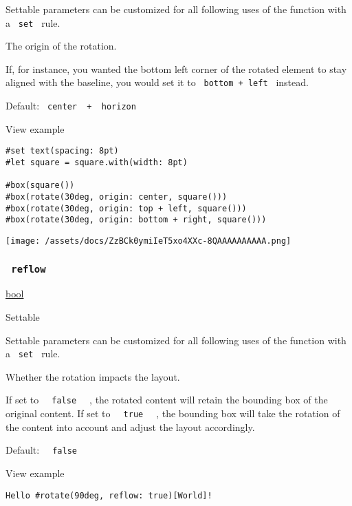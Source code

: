 \label{parameters-origin-settable-tooltip}
Settable parameters can be customized for all following uses of the
function with a \texttt{\ set\ } rule.

The origin of the rotation.

If, for instance, you wanted the bottom left corner of the rotated
element to stay aligned with the baseline, you would set it to
\texttt{\ bottom\ +\ left\ } instead.

Default: \texttt{\ center\ }{\texttt{\ +\ }}\texttt{\ horizon\ }


View example

\begin{verbatim}
#set text(spacing: 8pt)
#let square = square.with(width: 8pt)

#box(square())
#box(rotate(30deg, origin: center, square()))
#box(rotate(30deg, origin: top + left, square()))
#box(rotate(30deg, origin: bottom + right, square()))
\end{verbatim}

\texttt{[image: /assets/docs/ZzBCk0ymiIeT5xo4XXc-8QAAAAAAAAAA.png]}

\subsubsection{\texorpdfstring{\texttt{\ reflow\ }}{ reflow }}\label{parameters-reflow}

\href{/docs/reference/foundations/bool/}{bool}

{{ Settable }}

\label{parameters-reflow-settable-tooltip}
Settable parameters can be customized for all following uses of the
function with a \texttt{\ set\ } rule.

Whether the rotation impacts the layout.

If set to \texttt{\ }{\texttt{\ false\ }}\texttt{\ } , the rotated
content will retain the bounding box of the original content. If set to
\texttt{\ }{\texttt{\ true\ }}\texttt{\ } , the bounding box will take
the rotation of the content into account and adjust the layout
accordingly.

Default: \texttt{\ }{\texttt{\ false\ }}\texttt{\ }


View example

\begin{verbatim}
Hello #rotate(90deg, reflow: true)[World]!
\end{verbatim}

